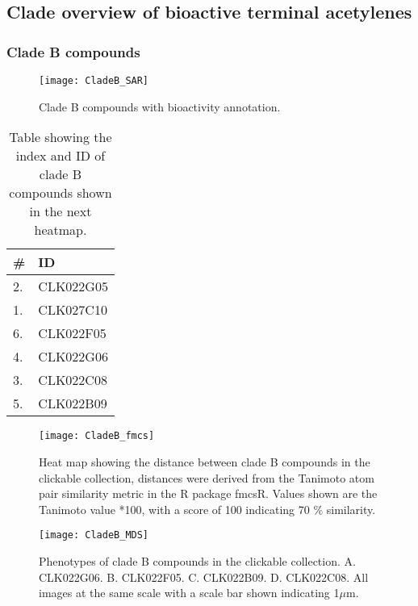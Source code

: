 \subsection{Clade overview of bioactive terminal acetylenes}

\subsubsection{Clade B compounds}

\begin{figure}
\texttt{[image: CladeB\_SAR]}
\caption{Clade B compounds with bioactivity annotation.}
\label{fig:CladeB_SAR}
\end{figure}

\begin{table}\centering
    \begin{tabular}{|l|l|}
    \hline
  # & ID \\ \hline
  2. & CLK022G05  \\ \hline
1. & CLK027C10  \\ \hline
6. & CLK022F05  \\ \hline
4. & CLK022G06  \\ \hline
3. & CLK022C08  \\ \hline
5. & CLK022B09  \\ \hline
    \end{tabular}
    \caption {Table showing the  index and ID of clade B compounds shown in the next heatmap.} 
    \label{table:CladeB_fmcsVals}
\end{table}



\begin{figure}\centering
\texttt{[image: CladeB\_fmcs]}
\caption{Heat map showing the distance between clade B compounds in the clickable collection, distances were derived from the Tanimoto atom pair similarity metric in the R package fmcsR. Values shown are the Tanimoto value *100, with a score of 100 indicating 70 {\%} similarity.}
\label{fig:CladeB_fmcs}
\end{figure}



\begin{figure}
\centering
\texttt{[image: CladeB\_MDS]}
\caption{Phenotypes of clade B compounds in the clickable collection. A. CLK022G06. B. CLK022F05. C. CLK022B09. D. CLK022C08. All images at the same scale with a scale bar shown indicating 1$\mu$m.}
\label{fig:CladeB_MDS}
\end{figure}


